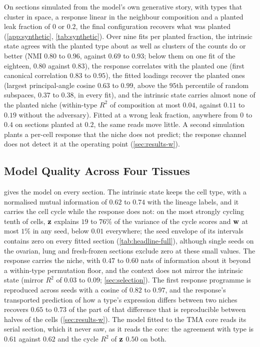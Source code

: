  On sections simulated from the model's own generative story, with types that cluster in space, a response linear in the neighbour composition and a planted leak fraction of $0$ or $0.2$, the final configuration recovers what was planted (\cref{app:synthetic}, \cref{tab:synthetic}). Over nine fits per planted fraction, the intrinsic state agrees with the planted type about as well as clusters of the counts do or better (NMI $0.80$ to $0.96$, against $0.69$ to $0.93$; below them on one fit of the eighteen, $0.80$ against $0.83$), the response correlates with the planted one (first canonical correlation $0.83$ to $0.95$), the fitted loadings recover the planted ones (largest principal-angle cosine $0.63$ to $0.99$, above the $95$th percentile of random subspaces, $0.37$ to $0.38$, in every fit), and the intrinsic state carries almost none of the planted niche (within-type $R^2$ of composition at most $0.04$, against $0.11$ to $0.19$ without the adversary). Fitted at a wrong leak fraction, anywhere from $0$ to $0.4$ on sections planted at $0.2$, the same reads move little. A second simulation plants a per-cell response that the niche does not predict; the response channel does not detect it at the operating point (\cref{sec:results-w}).

\subsection{Model Quality Across Four Tissues}
\label{sec:results-quality}

  gives the model on every section. The intrinsic state keeps the cell type, with a normalised mutual information of $0.62$ to $0.74$ with the lineage labels, and it carries the cell cycle while the response does not: on the most strongly cycling tenth of cells, $\mathbf{z}$ explains $19$ to $76\%$ of the variance of the cycle scores and $\mathbf{w}$ at most $1\%$ in any seed, below $0.01$ everywhere; the seed envelope of its intervals contains zero on every fitted section (\cref{tab:headline-full}), although single seeds on the ovarian, lung and fresh-frozen sections exclude zero at these small values. The response carries the niche, with $0.47$ to $0.60$ nats of information about it beyond a within-type permutation floor, and the context does not mirror the intrinsic state (mirror $R^2$ of $0.03$ to $0.09$; \cref{sec:selection}). The first response programme is reproduced across seeds with a cosine of $0.82$ to $0.97$, and the response's transported prediction of how a type's expression differs between two niches recovers $0.65$ to $0.73$ of the part of that difference that is reproducible between halves of the cells (\cref{sec:results-w}). The model fitted to the TMA core reads its serial section, which it never saw, as it reads the core: the agreement with type is $0.61$ against $0.62$ and the cycle $R^2$ of $\mathbf{z}$ $0.50$ on both.

